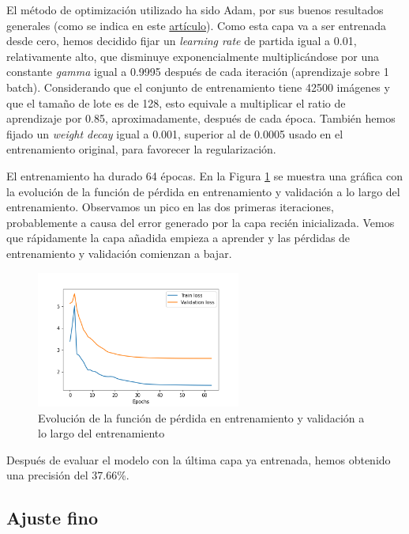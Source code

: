 \documentclass[10pt,a4paper]{article}
\begin{document}
El método de optimización utilizado ha sido Adam, por sus buenos resultados generales (como se indica en este \href{https://arxiv.org/pdf/1609.04747.pdf}{artículo}). Como esta capa va a ser entrenada desde cero, hemos decidido fijar un \textit{learning rate} de partida igual a 0.01, relativamente alto, que disminuye exponencialmente multiplicándose por una constante \textit{gamma} igual a 0.9995 después de cada iteración (aprendizaje sobre 1 batch). Considerando que el conjunto de entrenamiento tiene 42500 imágenes y que el tamaño de lote es de 128, esto equivale a multiplicar el ratio de aprendizaje por 0.85, aproximadamente, después de cada época.  También hemos fijado un \textit{weight decay} igual a 0.001, superior al de 0.0005 usado en el entrenamiento original, para favorecer la regularización.

El entrenamiento ha durado 64 épocas. En la Figura \ref{fig:loss_cifar} se muestra una gráfica con la evolución de la función de pérdida en entrenamiento y validación a lo largo del entrenamiento. Observamos un pico en las dos primeras iteraciones, probablemente a causa del error generado por la capa recién inicializada. Vemos que rápidamente la capa añadida empieza a aprender y las pérdidas de entrenamiento y validación comienzan a bajar.

\begin{figure}[h]
	\centering
	\includegraphics[width=0.6\textwidth]{loss_cifar}
	\caption{Evolución de la función de pérdida en entrenamiento y validación a lo largo del entrenamiento}
	\label{fig:loss_cifar}
\end{figure}

Después de evaluar el modelo con la última capa ya entrenada, hemos obtenido una precisión del 37.66\%.



\subsection{Ajuste fino}
\end{document}
